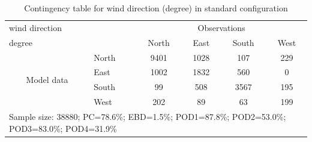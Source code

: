 \documentclass[a4paper,english]{article}
\begin{document}
\begin{table}[]
\begin{center}
\begin{tabular}{llcccc}
\hline
{wind direction}                                       &                             &    \multicolumn{4}{c}{Observations}                 \\
{degree}                                       &                             & {North}   & {East} & {South} & {West} \\
\hline
\multicolumn{1}{c}{\multirow{4}{*}{Model data}}  & {North}                    & 9401   & 1028    & 107     & 229\\
                                                 & {East}                     & 1002   & 1832    & 560     & 0\\
                                                 & {South}                    & 99   & 508   & 3567    & 195\\
                                                 & {West}                     & 202  & 89   & 63    & 199\\
\hline 
\multicolumn{6}{l}{Sample size: 38880; PC=78.6\%; EBD=1.5\%; POD1=87.8\%; POD2=53.0\%; POD3=83.0\%; POD4=31.9\%}                 \\
\end{tabular}
\end{center}
\caption{Contingency table for {wind direction} (degree) in standard configuration}
\label{tab:contingencywdBEF}
\end{table}
\end{document}
